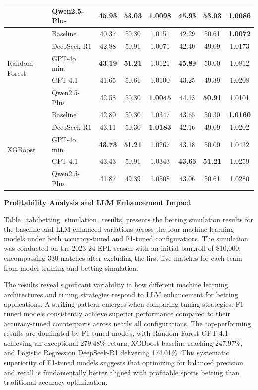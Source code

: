 \documentclass[conference]{IEEEtran}
\begin{document}
\begin{table}[htbp]
\begin{tabular}{l l c c c c c c}
& Qwen2.5-Plus & 45.93 & 53.03 & 1.0098 & 45.93 & 53.03 & \textbf{1.0086} \\
\hline
\multirow{5}{*}{Random Forest}
& Baseline & 40.37 & 50.30 & 1.0151 & 42.29 & 50.61 & \textbf{1.0072} \\
& DeepSeek-R1 & 42.88 & 50.91 & 1.0071 & 42.40 & 49.09 & 1.0173 \\
& GPT-4o mini & \textbf{43.19} & \textbf{51.21} & 1.0121 & \textbf{45.89} & 50.00 & 1.0812 \\
& GPT-4.1 & 41.65 & 50.61 & 1.0100 & 43.25 & 49.39 & 1.0208 \\
& Qwen2.5-Plus & 42.58 & 50.30 & \textbf{1.0045} & 44.13 & \textbf{50.91} & 1.0101 \\
\hline
\multirow{5}{*}{XGBoost}
& Baseline & 42.80 & 50.30 & 1.0347 & 43.65 & 50.30 & \textbf{1.0160} \\
& DeepSeek-R1 & 43.11 & 50.30 & \textbf{1.0183} & 42.16 & 49.09 & 1.0202 \\
& GPT-4o mini & \textbf{43.73} & \textbf{51.21} & 1.0267 & 43.18 & 50.00 & 1.0432 \\
& GPT-4.1 & 43.43 & 50.91 & 1.0343 & \textbf{43.66} & \textbf{51.21} & 1.0259 \\
& Qwen2.5-Plus & 41.87 & 49.39 & 1.0508 & 43.06 & 50.61 & 1.0280 \\
\hline
\end{tabular}
\end{table}

\noindent\textbf{Profitability Analysis and LLM Enhancement Impact}

Table~\ref{tab:betting_simulation_results} presents the betting simulation results for the baseline and LLM-enhanced variations across the four machine learning models under both accuracy-tuned and F1-tuned configurations. The simulation was conducted on the 2023-24 EPL season with an initial bankroll of \$10,000, encompassing 330 matches after excluding the first five matches for each team from model training and betting simulation.

The results reveal significant variability in how different machine learning architectures and tuning strategies respond to LLM enhancement for betting applications. A striking pattern emerges when comparing tuning strategies: F1-tuned models consistently achieve superior performance compared to their accuracy-tuned counterparts across nearly all configurations. The top-performing results are dominated by F1-tuned models, with Random Forest GPT-4.1 achieving an exceptional 279.48\% return, XGBoost baseline reaching 247.97\%, and Logistic Regression DeepSeek-R1 delivering 174.01\%. This systematic superiority of F1-tuned models suggests that optimizing for balanced precision and recall is fundamentally better aligned with profitable sports betting than traditional accuracy optimization.
\end{document}
